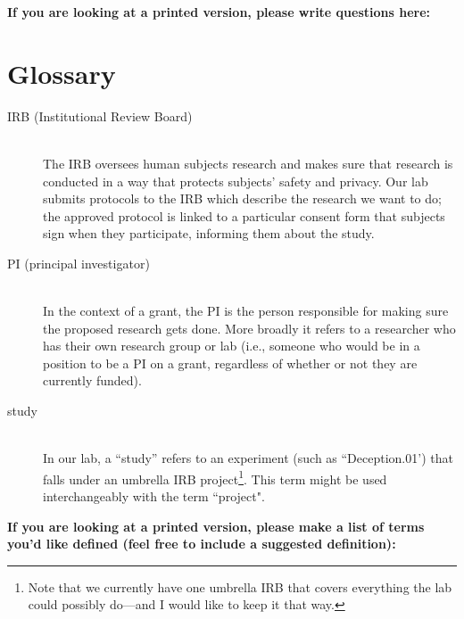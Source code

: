 \documentclass[letterpaper,12pt,oneside]{memoir}
\begin{document}
{\begin{description}
\end{description}

\vspace{.2in}
\noindent \textbf{\large If you are looking at a printed version, please write questions here:}


%

\chapter{Glossary}

\begin{description}

\item[IRB (Institutional Review Board)] \hfill \\
The IRB oversees human subjects research and makes sure that research is conducted in a way that protects subjects' safety and privacy. Our lab submits protocols to the IRB which describe the research we want to do; the approved protocol is linked to a particular consent form that subjects sign when they participate, informing them about the study.

\item[PI (principal investigator)] \hfill \\
In the context of a grant, the PI is the person responsible for making sure the proposed research gets done. More broadly it refers to a researcher who has their own research group or lab (i.e., someone who would be in a position to be a PI on a grant, regardless of whether or not they are currently funded).

\item[study] \hfill \\
In our lab, a ``study'' refers to an experiment (such as ``Deception.01') that falls under an umbrella IRB project\footnote{Note that we currently have one umbrella IRB that covers everything the lab could possibly do---and I would like to keep it that way.}. This term might be used interchangeably with the term ``project". 

\end{description}

\vspace{.2in}
\noindent \textbf{\large If you are looking at a printed version, please make a list of terms you'd like defined (feel free to include a suggested definition):}



%
%

}
\end{document}
